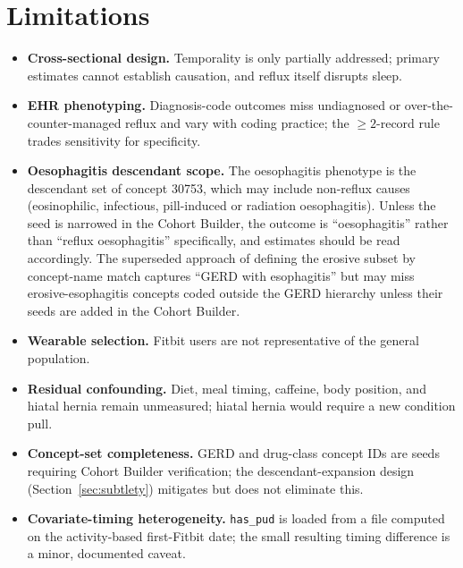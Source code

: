 \documentclass[11pt]{article}
\newcommand{\code}[1]{\texttt{\small #1}}
\begin{document}
\section{Limitations}
\begin{itemize}[leftmargin=1.4em,itemsep=2pt]
  \item \textbf{Cross-sectional design.} Temporality is only partially addressed; primary estimates
  cannot establish causation, and reflux itself disrupts sleep.
  \item \textbf{EHR phenotyping.} Diagnosis-code outcomes miss undiagnosed or over-the-counter-managed
  reflux and vary with coding practice; the $\geq 2$-record rule trades sensitivity for specificity.
  \item \textbf{Oesophagitis descendant scope.} The oesophagitis phenotype is the descendant set of
  concept 30753, which may include non-reflux causes (eosinophilic, infectious, pill-induced or
  radiation oesophagitis). Unless the seed is narrowed in the Cohort Builder, the outcome is
  ``oesophagitis'' rather than ``reflux oesophagitis'' specifically, and estimates should be read
  accordingly. The superseded approach of defining the erosive subset by concept-name
  match captures ``GERD with esophagitis'' but may miss erosive-esophagitis concepts coded outside the
  GERD hierarchy unless their seeds are added in the Cohort Builder.
  \item \textbf{Wearable selection.} Fitbit users are not representative of the general population.
  \item \textbf{Residual confounding.} Diet, meal timing, caffeine, body position, and hiatal hernia
  remain unmeasured; hiatal hernia would require a new condition pull.
  \item \textbf{Concept-set completeness.} GERD and drug-class concept IDs are seeds requiring Cohort
  Builder verification; the descendant-expansion design (Section~\ref{sec:subtlety}) mitigates but does
  not eliminate this.
  \item \textbf{Covariate-timing heterogeneity.} \code{has_pud} is loaded from a file computed on the
  activity-based first-Fitbit date; the small resulting timing difference is a minor, documented caveat.
\end{itemize}

\end{document}
